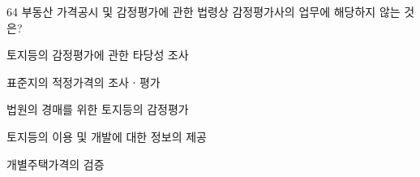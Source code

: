 \begin{question}{64}
부동산 가격공시 및 감정평가에 관한 법령상 감정평가사의 업무에 해당하지 않는 것은?
\begin{choices}
  \item 토지등의 감정평가에 관한 타당성 조사
  \item 표준지의 적정가격의 조사ㆍ평가
  \item 법원의 경매를 위한 토지등의 감정평가
  \item 토지등의 이용 및 개발에 대한 정보의 제공
  \item 개별주택가격의 검증
\end{choices}
\end{question}
